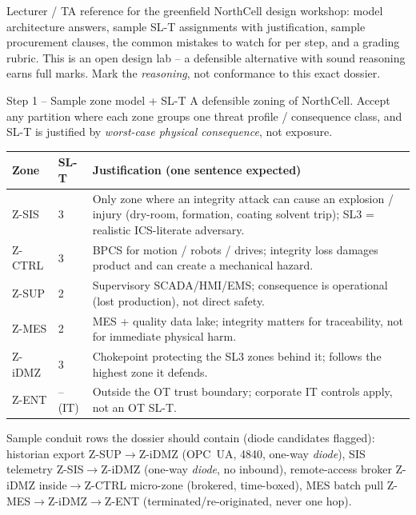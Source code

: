 \documentclass[11pt,a4paper]{article}
\begin{document}
\labheader

\begin{goalbox}
Lecturer / TA reference for the greenfield NorthCell design workshop:
model architecture answers, sample SL-T assignments with justification,
sample procurement clauses, the common mistakes to watch for per step,
and a grading rubric. This is an open design lab -- a defensible
alternative with sound reasoning earns full marks. Mark the
\emph{reasoning}, not conformance to this exact dossier.
\end{goalbox}

\begin{solutionbox}{Step 1 -- Sample zone model + SL-T}
A defensible zoning of NorthCell. Accept any partition where each zone
groups one threat profile / consequence class, and SL-T is justified by
\emph{worst-case physical consequence}, not exposure.

\vspace{2pt}
\small
\begin{tabular}{@{}p{1.8cm}p{1.2cm}p{10.3cm}@{}}
\toprule
\textbf{Zone} & \textbf{SL-T} & \textbf{Justification (one sentence expected)} \\
\midrule
Z-SIS   & 3 & Only zone where an integrity attack can cause an explosion / injury (dry-room, formation, coating solvent trip); SL3 = realistic ICS-literate adversary. \\
Z-CTRL  & 3 & BPCS for motion / robots / drives; integrity loss damages product and can create a mechanical hazard. \\
Z-SUP   & 2 & Supervisory SCADA/HMI/EMS; consequence is operational (lost production), not direct safety. \\
Z-MES   & 2 & MES + quality data lake; integrity matters for traceability, not for immediate physical harm. \\
Z-iDMZ  & 3 & Chokepoint protecting the SL3 zones behind it; follows the highest zone it defends. \\
Z-ENT   & --(IT) & Outside the OT trust boundary; corporate IT controls apply, not an OT SL-T. \\
\bottomrule
\end{tabular}
\normalsize
\par\vspace{2mm}
Sample conduit rows the dossier should contain (diode candidates flagged):
historian export Z-SUP$\to$Z-iDMZ (OPC~UA, 4840, one-way \emph{diode}),
SIS telemetry Z-SIS$\to$Z-iDMZ (one-way \emph{diode}, no inbound),
remote-access broker Z-iDMZ inside$\to$Z-CTRL micro-zone (brokered, time-boxed),
MES batch pull Z-MES$\to$Z-iDMZ$\to$Z-ENT (terminated/re-originated, never one hop).
\end{solutionbox}
\end{document}

